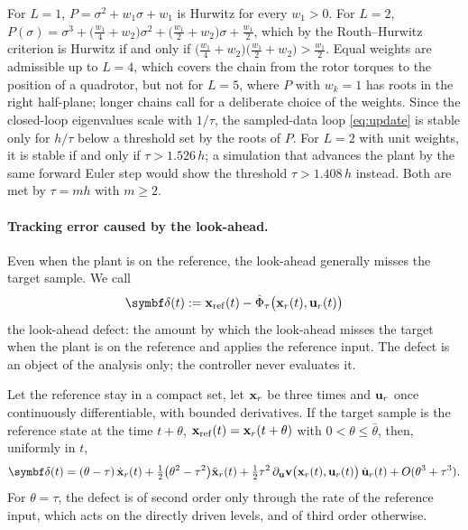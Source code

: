 \begin{remark}\label{rem:chain}
For $L = 1$, $P = \sigma^2 + w_1\sigma + w_1$ is Hurwitz for every $w_1 > 0$.
For $L = 2$,
$P(\sigma) = \sigma^3 + \bigl(\frac{w_1}{4} + w_2\bigr)\sigma^2 + \bigl(\frac{w_1}{2} + w_2\bigr)\sigma
+ \frac{w_1}{2}$, which by the Routh--Hurwitz criterion is Hurwitz if and only if
$\bigl(\frac{w_1}{4} + w_2\bigr)\bigl(\frac{w_1}{2} + w_2\bigr) > \frac{w_1}{2}$.
Equal weights are admissible up to $L = 4$, which covers the chain from the rotor torques to the
position of a quadrotor, but not for $L = 5$, where $P$ with $w_k = 1$ has roots in the right
half-plane; longer chains call for a deliberate choice of the weights.
Since the closed-loop eigenvalues scale with $1/\tau$, the sampled-data loop \eqref{eq:update} is
stable only for $h/\tau$ below a threshold set by the roots of $P$.
For $L = 2$ with unit weights, it is stable if and only if $\tau > 1.526\,h$; a simulation that
advances the plant by the same forward Euler step would show the threshold $\tau > 1.408\,h$ instead.
Both are met by $\tau = mh$ with $m \ge 2$.
\end{remark}

\paragraph{Tracking error caused by the look-ahead.}
Even when the plant is on the reference, the look-ahead generally misses the target sample.
We call
\begin{equation}\label{eq:defect}
    \bdelta(t) := \bxref(t) - \hat\Phi_\tau\bigl(\bx_r(t),\bu_r(t)\bigr)
\end{equation}
the look-ahead defect: the amount by which the look-ahead misses the target when the plant is on the
reference and applies the reference input.
The defect is an object of the analysis only; the controller never evaluates it.

\begin{lemma}\label{lem:defect}
Let the reference stay in a compact set, let $\mathbf{x}_r$ be three times and $\mathbf{u}_r$ once continuously
differentiable, with bounded derivatives. If the target sample is the reference state at the time
$t + \theta$, $\mathbf{x}_{\mathrm{ref}}(t) = \mathbf{x}_r(t+\theta)$ with $0 < \theta \le \bar\theta$, then, uniformly in $t$,
\begin{equation}\label{eq:defect-expansion}
    \bdelta(t) = (\theta - \tau)\,\dot\bx_r(t)
    + \tfrac12\bigl(\theta^2 - \tau^2\bigr)\ddot\bx_r(t)
    + \tfrac12\tau^2\,\partial_{\bu}\bv\bigl(\bx_r(t),\bu_r(t)\bigr)\,\dot\bu_r(t)
    + O(\theta^3 + \tau^3).
\end{equation}
For $\theta = \tau$, the defect is of second order only through the rate of the reference input, which
acts on the directly driven levels, and of third order otherwise.
\end{lemma}

